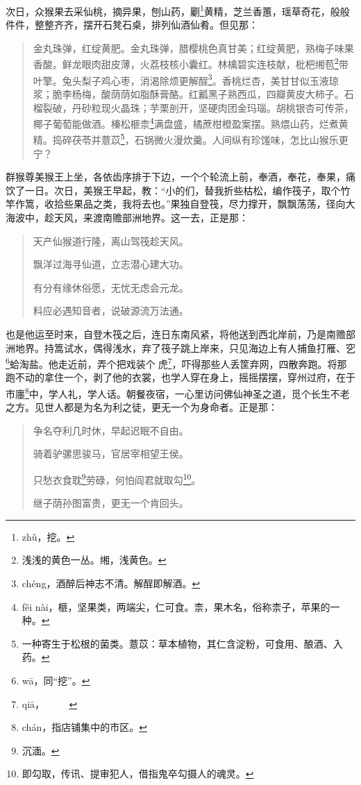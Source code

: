 \documentclass[12pt,UTF8]{ctexbook}
\begin{document}
次日，众猴果去采仙桃，摘异果，刨山药，劚\footnote{zh\v{u}，挖。}黄精，芝兰香蕙，瑶草奇花，般般件件，整整齐齐，摆开石凳石桌，排列仙酒仙肴。但见那：

\begin{quotation}
金丸珠弹，红绽黄肥。金丸珠弹，腊樱桃色真甘美；红绽黄肥，熟梅子味果香酸。鲜龙眼肉甜皮薄，火荔枝核小囊红。林檎碧实连枝献，枇杷缃苞\footnote{浅浅的黄色一丛。缃，浅黄色。}带叶擎。兔头梨子鸡心枣，消渴除烦更解酲\footnote{ch\'eng，酒醉后神志不清。解酲即解酒。}。香桃烂杏，美甘甘似玉液琼浆；脆李杨梅，酸荫荫如脂酥膏酪。红瓤黑子熟西瓜，四瓣黄皮大柿子。石榴裂破，丹砂粒现火晶珠；芋栗剖开，坚硬肉团金玛瑙。胡桃银杏可传茶，椰子葡萄能做酒。榛松榧柰\footnote{f\v{e}i n\`ai，榧，坚果类，两端尖，仁可食。柰，果木名，俗称柰子，苹果的一种。}满盘盛，橘蔗柑橙盈案摆。熟煨山药，烂煮黄精。捣碎茯苓并薏苡\footnote{一种寄生于松根的菌类。薏苡：草本植物，其仁含淀粉，可食用、酿酒、入药。}，石锅微火漫炊羹。人间纵有珍馐味，怎比山猴乐更宁？
\end{quotation}

群猴尊美猴王上坐，各依齿序排于下边，一个个轮流上前，奉酒，奉花，奉果，痛饮了一日。次日，美猴王早起，教：“小的们，替我折些枯松，编作筏子，取个竹竿作篙，收拾些果品之类，我将去也。”果独自登筏，尽力撑开，飘飘荡荡，径向大海波中，趁天风，来渡南赡部洲地界。这一去，正是那：

\begin{quotation}
天产仙猴道行隆，离山驾筏趁天风。

飘洋过海寻仙道，立志潜心建大功。

有分有缘休俗愿，无忧无虑会元龙。

料应必遇知音者，说破源流万法通。
\end{quotation}

也是他运至时来，自登木筏之后，连日东南风紧，将他送到西北岸前，乃是南赡部洲地界。持篙试水，偶得浅水，弃了筏子跳上岸来，只见海边上有人捕鱼打雁、穵\footnote{w\=a，同“挖”。}蛤淘盐。他走近前，弄个把戏装个𡤫虎\footnote{qi\=a，𡤫虎，吓唬人的人。}，吓得那些人丢筐弃网，四散奔跑。将那跑不动的拿住一个，剥了他的衣裳，也学人穿在身上，摇摇摆摆，穿州过府，在于市廛\footnote{chán，指店铺集中的市区。}中，学人礼，学人话。朝餐夜宿，一心里访问佛仙神圣之道，觅个长生不老之方。见世人都是为名为利之徒，更无一个为身命者。正是那：

\begin{quotation}
争名夺利几时休，早起迟眠不自由。

骑着驴骡思骏马，官居宰相望王侯。

只愁衣食耽\footnote{沉湎。}劳碌，何怕阎君就取勾\footnote{即勾取，传讯、提审犯人，借指鬼卒勾摄人的魂灵。}。

继子荫孙图富贵，更无一个肯回头。
\end{quotation}
\end{document}
